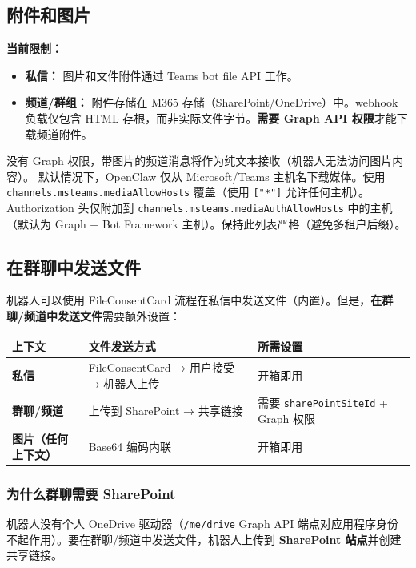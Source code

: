 \subsection{附件和图片}


\textbf{当前限制：}

\begin{itemize}
  \item \textbf{私信：} 图片和文件附件通过 Teams bot file API 工作。
  \item \textbf{频道/群组：} 附件存储在 M365 存储（SharePoint/OneDrive）中。webhook 负载仅包含 HTML 存根，而非实际文件字节。\textbf{需要 Graph API 权限}才能下载频道附件。
\end{itemize}


没有 Graph 权限，带图片的频道消息将作为纯文本接收（机器人无法访问图片内容）。
默认情况下，OpenClaw 仅从 Microsoft/Teams 主机名下载媒体。使用 \texttt{channels.msteams.mediaAllowHosts} 覆盖（使用 \texttt{["*"]} 允许任何主机）。
Authorization 头仅附加到 \texttt{channels.msteams.mediaAuthAllowHosts} 中的主机（默认为 Graph + Bot Framework 主机）。保持此列表严格（避免多租户后缀）。

\subsection{在群聊中发送文件}


机器人可以使用 FileConsentCard 流程在私信中发送文件（内置）。但是，\textbf{在群聊/频道中发送文件}需要额外设置：


\begin{table}[h]
\centering
\small
\begin{tabular}{|l|l|l|}
\hline
上下文 & 文件发送方式 & 所需设置 \\
\hline
\textbf{私信} & FileConsentCard → 用户接受 → 机器人上传 & 开箱即用 \\
\hline
\textbf{群聊/频道} & 上传到 SharePoint → 共享链接 & 需要 \texttt{sharePointSiteId} + Graph 权限 \\
\hline
\textbf{图片（任何上下文）} & Base64 编码内联 & 开箱即用 \\
\hline
\end{tabular}
\end{table}



\subsubsection{为什么群聊需要 SharePoint}


机器人没有个人 OneDrive 驱动器（\texttt{/me/drive} Graph API 端点对应用程序身份不起作用）。要在群聊/频道中发送文件，机器人上传到 \textbf{SharePoint 站点}并创建共享链接。

